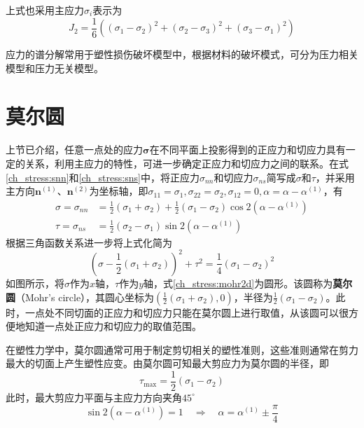 上式也采用主应力$\sigma_i$表示为
\begin{equation}\label{ch_stress:J22}
    J_2 = \frac{1}{6}((\sigma_{1} - \sigma_{2})^2 + (\sigma_{2}-\sigma_{3})^2 + (\sigma_{3}-\sigma_{1})^2)
\end{equation}\par
应力的谱分解常用于塑性损伤破坏模型中，根据材料的破坏模式，可分为压力相关模型和压力无关模型。

\section{莫尔圆}
上节已介绍，任意一点处的应力$\boldsymbol \sigma$在不同平面上投影得到的正应力和切应力具有一定的关系，利用主应力的特性，可进一步确定正应力和切应力之间的联系。在式\eqref{ch_stress:snn}和\eqref{ch_stress:sns}中，将正应力$\sigma_{nn}$和切应力$\sigma_{ns}$简写成$\sigma$和$\tau$，并采用主方向$\boldsymbol n^{(1)}$、$\boldsymbol n^{(2)}$为坐标轴，即$\sigma_{11} = \sigma_1, \sigma_{22} = \sigma_2, \sigma_{12} = 0, \alpha = \alpha - \alpha^{(1)}$，有
\begin{subequations}
    \begin{align}
        \sigma = \sigma_{nn} &= \frac{1}{2}(\sigma_1 + \sigma_2) + \frac{1}{2}(\sigma_1 - \sigma_2)\cos 2 (\alpha - \alpha^{(1)}) \\
        \tau = \sigma_{ns} &= \frac{1}{2}(\sigma_2 - \sigma_1) \sin 2(\alpha - \alpha^{(1)})
    \end{align}
\end{subequations}
根据三角函数关系进一步将上式化简为
\begin{equation}\label{ch_stress:mohr2d}
    (\sigma - \frac{1}{2}(\sigma_1 + \sigma_2))^2 + \tau^2 = \frac{1}{4}(\sigma_1-\sigma_2)^2
\end{equation}
如图所示，将$\sigma$作为$x$轴，$\tau$作为$y$轴，式\eqref{ch_stress:mohr2d}为圆形。该圆称为\textbf{莫尔圆}（Mohr's circle），其圆心坐标为$(\frac{1}{2}(\sigma_1 + \sigma_2),0)$，半径为$\frac{1}{2}(\sigma_1-\sigma_2)$。此时，一点处不同切面的正应力和切应力只能在莫尔圆上进行取值，从该圆可以很方便地知道一点处正应力和切应力的取值范围。\par
在塑性力学中，莫尔圆通常可用于制定剪切相关的塑性准则，这些准则通常在剪力最大的切面上产生塑性应变。由莫尔圆可知最大剪应力为莫尔圆的半径，即
\begin{equation}
    \tau_{\mathrm{max}} = \frac{1}{2}(\sigma_1 - \sigma_2)
\end{equation}
此时，最大剪应力平面与主应力方向夹角$45^\circ$
\begin{equation}
    \sin 2(\alpha - \alpha^{(1)}) = 1 \quad \Rightarrow \quad \alpha = \alpha^{(1)} \pm \frac{\pi}{4}
\end{equation}
